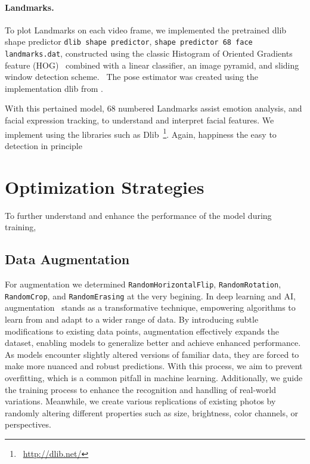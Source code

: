 \paragraph{Landmarks.}
To plot Landmarks on each video frame, we implemented the pretrained dlib shape predictor 
\texttt{dlib shape predictor}, %
\texttt{shape predictor 68 face landmarks.dat}, 
constructed using the classic Histogram of Oriented Gradients feature (HOG)~\cite{1467360} combined with a linear classifier, 
an image pyramid, and sliding window detection scheme.~\cite{dlib_site}
The pose estimator was created using the implementation dlib from \citet{6909637}.

With this pertained model, 68 numbered Landmarks assist emotion analysis, 
and facial expression tracking, to understand and interpret facial features.
We implement using the libraries such as Dlib~\footnote{~\url{http://dlib.net/}}. %
Again,  happiness the easy to detection in principle 



\section{Optimization Strategies}
\label{sec:optim}

To further understand and enhance the performance of the model during training, 

\subsection{Data Augmentation}
\label{sec:optim:aug}

For augmentation we determined \texttt{RandomHorizontalFlip}, \texttt{RandomRotation}, 
\texttt{RandomCrop}, and \texttt{RandomErasing} at the very begining. 
In deep learning and AI, 
augmentation~\cite{augment} stands as a transformative technique, 
empowering algorithms to learn from and adapt to a wider range of data. 
By introducing subtle modifications to existing data points, 
augmentation effectively expands the dataset, 
enabling models to generalize better and achieve enhanced performance. 
As models encounter slightly altered versions of familiar data, 
they are forced to make more nuanced and robust predictions. 
With this process, we aim to prevent overfitting, which is a common pitfall in machine learning. 
Additionally, we guide the training process to enhance the recognition and handling of real-world variations.
Meanwhile, we create various replications of existing photos by randomly altering different properties such as size, brightness, color channels, or perspectives.

